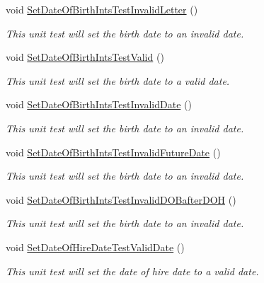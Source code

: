 \begin{DoxyCompactItemize}
void \hyperlink{class_my_all_employee_1_1_tests_1_1_full_time_employee_tests_a3f3d2617612859580d5dc47389eb1123}{Set\+Date\+Of\+Birth\+Ints\+Test\+Invalid\+Letter} ()
\begin{DoxyCompactList}\small\item\em This unit test will set the birth date to an invalid date. \end{DoxyCompactList}\item 
void \hyperlink{class_my_all_employee_1_1_tests_1_1_full_time_employee_tests_a41a49bd14578bcfdbf5b0f5a8a5736d6}{Set\+Date\+Of\+Birth\+Ints\+Test\+Valid} ()
\begin{DoxyCompactList}\small\item\em This unit test will set the birth date to a valid date. \end{DoxyCompactList}\item 
void \hyperlink{class_my_all_employee_1_1_tests_1_1_full_time_employee_tests_a3fa32eaeed78ad324b486fbfa551ad5a}{Set\+Date\+Of\+Birth\+Ints\+Test\+Invalid\+Date} ()
\begin{DoxyCompactList}\small\item\em This unit test will set the birth date to an invalid date. \end{DoxyCompactList}\item 
void \hyperlink{class_my_all_employee_1_1_tests_1_1_full_time_employee_tests_ad5818f2cc909a75875463cc5c1ffd7ec}{Set\+Date\+Of\+Birth\+Ints\+Test\+Invalid\+Future\+Date} ()
\begin{DoxyCompactList}\small\item\em This unit test will set the birth date to an invalid date. \end{DoxyCompactList}\item 
void \hyperlink{class_my_all_employee_1_1_tests_1_1_full_time_employee_tests_af7750b640456bbea7ebd909f992dc71c}{Set\+Date\+Of\+Birth\+Ints\+Test\+Invalid\+D\+O\+Bafter\+D\+O\+H} ()
\begin{DoxyCompactList}\small\item\em This unit test will set the birth date to an invalid date. \end{DoxyCompactList}\item 
void \hyperlink{class_my_all_employee_1_1_tests_1_1_full_time_employee_tests_a40c32764494bedbe96dcc6770a853f4e}{Set\+Date\+Of\+Hire\+Date\+Test\+Valid\+Date} ()
\begin{DoxyCompactList}\small\item\em This unit test will set the date of hire date to a valid date. \end{DoxyCompactList}\item 

\end{DoxyCompactItemize}
